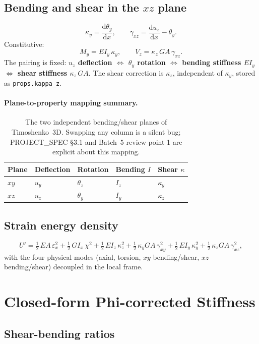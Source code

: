 \documentclass[11pt,a4paper]{article}
\newcommand{\dd}{\mathrm{d}}
\begin{document}
\subsection{Bending and shear in the $xz$ plane}
\[
\kappa_y = \frac{\dd \theta_y}{\dd x}, \qquad \gamma_{xz} = \frac{\dd u_z}{\dd x} - \theta_y.
\]
Constitutive:
\[
M_y = E I_y\,\kappa_y, \qquad V_z = \kappa_z\,GA\,\gamma_{xz}.
\]
The pairing is fixed: \textbf{$u_z$ deflection $\Leftrightarrow$ $\theta_y$ rotation $\Leftrightarrow$ bending stiffness $E I_y$ $\Leftrightarrow$ shear stiffness $\kappa_z\,GA$}. The shear correction is $\kappa_z$, independent of $\kappa_y$, stored as \texttt{props.kappa\_z}.

\paragraph{Plane-to-property mapping summary.}
\begin{table}[h!]
\centering
\begin{tabular}{l l l l l}
\toprule
Plane & Deflection & Rotation & Bending $I$ & Shear $\kappa$ \\
\midrule
$xy$ & $u_y$ & $\theta_z$ & $I_z$ & $\kappa_y$ \\
$xz$ & $u_z$ & $\theta_y$ & $I_y$ & $\kappa_z$ \\
\bottomrule
\end{tabular}
\caption{The two independent bending/shear planes of Timoshenko~3D. Swapping any column is a silent bug; PROJECT\_SPEC \S3.1 and Batch~5 review point 1 are explicit about this mapping.}
\end{table}

\subsection{Strain energy density}
\[
U' = \tfrac{1}{2}\,EA\,\varepsilon_x^2
   + \tfrac{1}{2}\,GI_x\,\chi^2
   + \tfrac{1}{2}\,E I_z\,\kappa_z^2 + \tfrac{1}{2}\,\kappa_y GA\,\gamma_{xy}^2
   + \tfrac{1}{2}\,E I_y\,\kappa_y^2 + \tfrac{1}{2}\,\kappa_z GA\,\gamma_{xz}^2,
\]
with the four physical modes (axial, torsion, $xy$ bending/shear, $xz$ bending/shear) decoupled in the local frame.

\section{Closed-form Phi-corrected Stiffness}\label{sec:stiffness}

\subsection{Shear-bending ratios}
\end{document}
